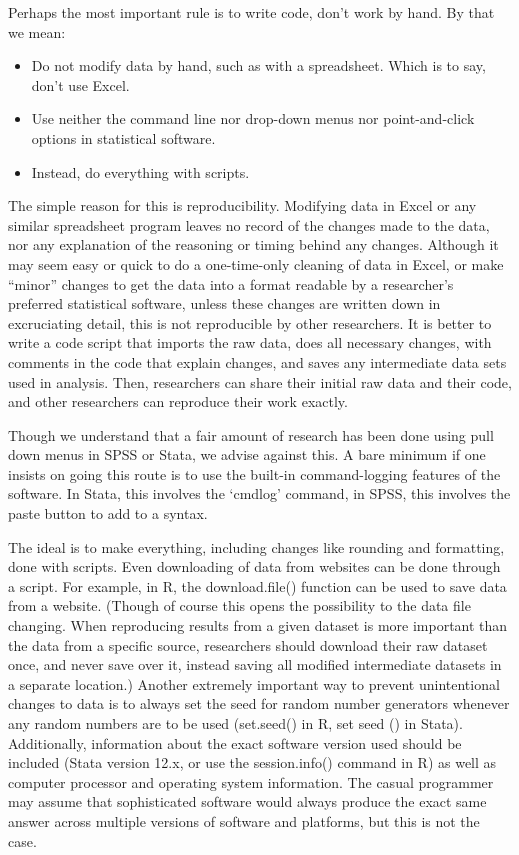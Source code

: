 \documentclass[12pt] {article}
\begin{document}
Perhaps the most important rule is to write code, don't work by hand. By
that we mean:

\begin{itemize}
\item
  Do not modify data by hand, such as with a spreadsheet. Which is to
  say, don't use Excel.
\item
  Use neither the command line nor drop-down menus nor point-and-click
  options in statistical software.
\item
  Instead, do everything with scripts.
\end{itemize}

The simple reason for this is reproducibility. Modifying data in Excel
or any similar spreadsheet program leaves no record of the changes made
to the data, nor any explanation of the reasoning or timing behind any
changes. Although it may seem easy or quick to do a one-time-only
cleaning of data in Excel, or make ``minor'' changes to get the data
into a format readable by a researcher's preferred statistical software,
unless these changes are written down in excruciating detail, this is
not reproducible by other researchers. It is better to write a code
script that imports the raw data, does all necessary changes, with
comments in the code that explain changes, and saves any intermediate
data sets used in analysis. Then, researchers can share their initial
raw data and their code, and other researchers can reproduce their work
exactly.

Though we understand that a fair amount of research has been done using
pull down menus in SPSS or Stata, we advise against this. A bare minimum
if one insists on going this route is to use the built-in
command-logging features of the software. In Stata, this involves the
`cmdlog' command, in SPSS, this involves the paste button to add to a
syntax.

The ideal is to make everything, including changes like rounding and
formatting, done with scripts. Even downloading of data from websites
can be done through a script. For example, in R, the download.file()
function can be used to save data from a website. (Though of course this
opens the possibility to the data file changing. When reproducing
results from a given dataset is more important than the data from a
specific source, researchers should download their raw dataset once, and
never save over it, instead saving all modified intermediate datasets in
a separate location.) Another extremely important way to prevent
unintentional changes to data is to always set the seed for random
number generators whenever any random numbers are to be used (set.seed()
in R, set seed () in Stata). Additionally, information about the exact
software version used should be included (Stata version 12.x, or use the
session.info() command in R) as well as computer processor and operating
system information. The casual programmer may assume that sophisticated
software would always produce the exact same answer across multiple
versions of software and platforms, but this is not the case.
\end{document}
